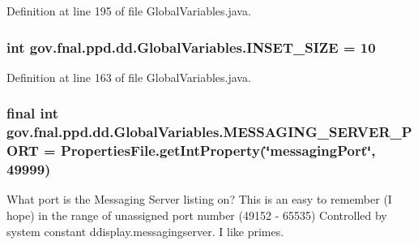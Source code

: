 Definition at line 195 of file Global\-Variables.\-java.

\hypertarget{classgov_1_1fnal_1_1ppd_1_1dd_1_1GlobalVariables_a938952f27836544cbcf8eed0fceecb99}{
\subsubsection[{I\-N\-S\-E\-T\-\_\-\-S\-I\-Z\-E}]{\setlength{\rightskip}{0pt plus 5cm}int gov.\-fnal.\-ppd.\-dd.\-Global\-Variables.\-I\-N\-S\-E\-T\-\_\-\-S\-I\-Z\-E = 10\hspace{0.3cm}{\ttfamily [static]}}}\label{classgov_1_1fnal_1_1ppd_1_1dd_1_1GlobalVariables_a938952f27836544cbcf8eed0fceecb99}


Definition at line 163 of file Global\-Variables.\-java.

\hypertarget{classgov_1_1fnal_1_1ppd_1_1dd_1_1GlobalVariables_a3afb8f4fd1dbbc82329ea9ff4aa3629e}{
\subsubsection[{M\-E\-S\-S\-A\-G\-I\-N\-G\-\_\-\-S\-E\-R\-V\-E\-R\-\_\-\-P\-O\-R\-T}]{\setlength{\rightskip}{0pt plus 5cm}final int gov.\-fnal.\-ppd.\-dd.\-Global\-Variables.\-M\-E\-S\-S\-A\-G\-I\-N\-G\-\_\-\-S\-E\-R\-V\-E\-R\-\_\-\-P\-O\-R\-T = {\bf Properties\-File.\-get\-Int\-Property}(\char`\"{}messaging\-Port\char`\"{}, 49999)\hspace{0.3cm}{\ttfamily [static]}}}\label{classgov_1_1fnal_1_1ppd_1_1dd_1_1GlobalVariables_a3afb8f4fd1dbbc82329ea9ff4aa3629e}
What port is the Messaging Server listing on? This is an easy to remember (I hope) in the range of unassigned port number (49152 -\/ 65535) Controlled by system constant ddisplay.\-messagingserver. I like primes. 

